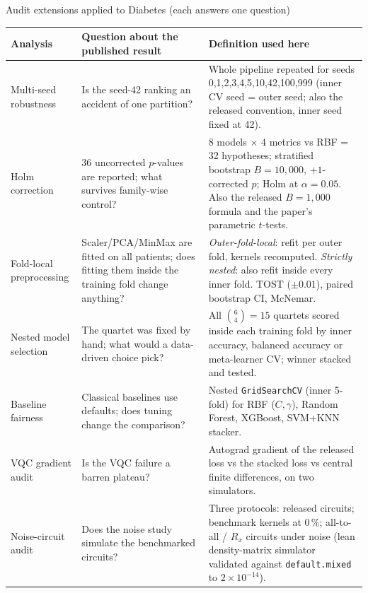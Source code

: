 \documentclass[aspectratio=169,10pt,t,xcolor={table}]{beamer}
\newcommand{\code}[1]{\texttt{\small #1}}
\begin{document}
\begin{frame}{Audit extensions applied to Diabetes (each answers one question)}
\tiny
\begin{tabular}{p{2.9cm}p{4.8cm}p{5.5cm}}
\toprule
Analysis & Question about the published result & Definition used here \\
\midrule
Multi-seed robustness & Is the seed-42 ranking an accident of one partition? & Whole pipeline repeated for seeds 0,1,2,3,4,5,10,42,100,999 (inner CV seed = outer seed; also the released convention, inner seed fixed at 42). \\
Holm correction & 36 uncorrected $p$-values are reported; what survives family-wise control? & 8 models $\times$ 4 metrics vs RBF = 32 hypotheses; stratified bootstrap $B=10{,}000$, $+1$-corrected $p$; Holm at $\alpha=0.05$. Also the released $B=1{,}000$ formula and the paper's parametric $t$-tests. \\
Fold-local preprocessing & Scaler/PCA/MinMax are fitted on all patients; does fitting them inside the training fold change anything? & \emph{Outer-fold-local}: refit per outer fold, kernels recomputed. \emph{Strictly nested}: also refit inside every inner fold. TOST ($\pm0.01$), paired bootstrap CI, McNemar. \\
Nested model selection & The quartet was fixed by hand; what would a data-driven choice pick? & All $\binom{6}{4}=15$ quartets scored inside each training fold by inner accuracy, balanced accuracy or meta-learner CV; winner stacked and tested. \\
Baseline fairness & Classical baselines use defaults; does tuning change the comparison? & Nested \code{GridSearchCV} (inner 5-fold) for RBF ($C,\gamma$), Random Forest, XGBoost, SVM+KNN stacker. \\
VQC gradient audit & Is the VQC failure a barren plateau? & Autograd gradient of the released loss vs the stacked loss vs central finite differences, on two simulators. \\
Noise-circuit audit & Does the noise study simulate the benchmarked circuits? & Three protocols: released circuits; benchmark kernels at 0\,\%; all-to-all / $R_x$ circuits under noise (lean density-matrix simulator validated against \code{default.mixed} to $2\times10^{-14}$). \\
\bottomrule
\end{tabular}
\end{frame}
\end{document}
